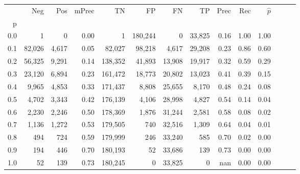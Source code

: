 \begin{tabular}{rrrrrrrrrrrrrr}
\toprule
{} &     Neg &    Pos & mPrec &       TN &       FP &      FN &      TP &  Prec &   Rec & $\hat{p}$ \\
p   &         &        &       &          &          &         &         &       &       &           \\
\midrule
0.0 &       1 &      0 &  0.00 &        1 &  180,244 &       0 &  33,825 &  0.16 &  1.00 &      1.00 \\
0.1 &  82,026 &  4,617 &  0.05 &   82,027 &   98,218 &   4,617 &  29,208 &  0.23 &  0.86 &      0.60 \\
0.2 &  56,325 &  9,291 &  0.14 &  138,352 &   41,893 &  13,908 &  19,917 &  0.32 &  0.59 &      0.29 \\
0.3 &  23,120 &  6,894 &  0.23 &  161,472 &   18,773 &  20,802 &  13,023 &  0.41 &  0.39 &      0.15 \\
0.4 &   9,965 &  4,853 &  0.33 &  171,437 &    8,808 &  25,655 &   8,170 &  0.48 &  0.24 &      0.08 \\
0.5 &   4,702 &  3,343 &  0.42 &  176,139 &    4,106 &  28,998 &   4,827 &  0.54 &  0.14 &      0.04 \\
0.6 &   2,230 &  2,246 &  0.50 &  178,369 &    1,876 &  31,244 &   2,581 &  0.58 &  0.08 &      0.02 \\
0.7 &   1,136 &  1,272 &  0.53 &  179,505 &      740 &  32,516 &   1,309 &  0.64 &  0.04 &      0.01 \\
0.8 &     494 &    724 &  0.59 &  179,999 &      246 &  33,240 &     585 &  0.70 &  0.02 &      0.00 \\
0.9 &     194 &    446 &  0.70 &  180,193 &       52 &  33,686 &     139 &  0.73 &  0.00 &      0.00 \\
1.0 &      52 &    139 &  0.73 &  180,245 &        0 &  33,825 &       0 &   nan &  0.00 &      0.00 \\
\bottomrule
\end{tabular}
